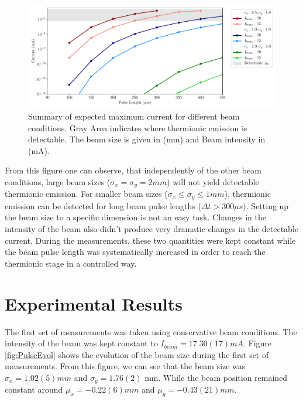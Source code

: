 \begin{figure}[h]
    \centering
    \includegraphics[width=0.90\columnwidth]{Figure_IsThereThermo/IsThereThermo.pdf}
    \caption{Summary of expected maximum current for different beam conditions. Gray Area indicates where thermionic emission is detectable. The beam size is given in (mm) and Beam intensity in (mA).}
    \label{fig:Jth_Cond}
\end{figure}

From this figure one can observe, that independently of the other beam conditions, large beam sizes ($\sigma_x = \sigma_y = 2 mm$) will not yield detectable thermionic emission. For smaller beam sizes ($\sigma_x \leq \sigma_y \leq 1 mm$), thermionic emission can be detected for long beam pulse lengths ($\Delta t > 300 \mu s$). Setting up the beam size to a specific dimension is not an easy task. Changes in the intensity of the beam also didn't produce very dramatic changes in the detectable current. During the measurements, these two quantities were kept constant while the beam pulse length was systematically increased in order to reach the thermionic stage in a controlled way. 

\section{Experimental Results}

The first set of measurements was taken using conservative beam conditions. The intensity of the beam was kept constant to $I_{beam} = 17.30 (17) mA$. Figure \ref{fig:PulseEvol} shows the evolution of the beam size during the first set of measurements. From this figure, we can see that the beam size was $\sigma_x = 1.02(5) mm$ and $\sigma_y = 1.76(2)$ mm. While the beam position remained constant around $\mu_x = -0.22(6) mm$ and $\mu_y = -0.43(21) mm$. 


